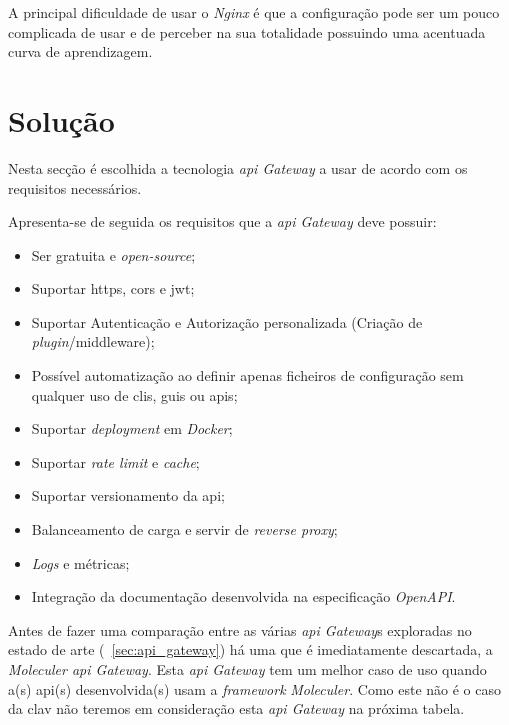 A principal dificuldade de usar o \textit{Nginx} é que a configuração pode ser um pouco complicada de usar e de perceber na sua totalidade possuindo uma acentuada curva de aprendizagem.

\section{Solução}

Nesta secção é escolhida a tecnologia \textit{\acrshort{api} Gateway} a usar de acordo com os requisitos necessários.

Apresenta-se de seguida os requisitos que a \textit{\acrshort{api} Gateway} deve possuir:
\begin{itemize}
    \item Ser gratuita e \textit{open-source};
    \item Suportar \acrshort{https}, \acrshort{cors} e \acrshort{jwt};
    \item Suportar Autenticação e Autorização personalizada (Criação de \textit{plugin}/middleware);
    \item Possível automatização ao definir apenas ficheiros de configuração sem qualquer uso de \acrshort{cli}s, 
    \acrshort{gui}s ou \acrshort{api}s;
    \item Suportar \textit{deployment} em \textit{Docker};
    \item Suportar \textit{rate limit} e \textit{cache};
    \item Suportar versionamento da \acrshort{api};
    \item Balanceamento de carga e servir de \textit{reverse proxy};
    \item \textit{Logs} e métricas;
    \item Integração da documentação desenvolvida na especificação \textit{OpenAPI}.
\end{itemize}

Antes de fazer uma comparação entre as várias \textit{\acrshort{api} Gateway}s exploradas no estado de arte 
(~\ref{sec:api_gateway}) há uma que é imediatamente descartada, a \textit{Moleculer \acrshort{api} Gateway}. 
Esta \textit{\acrshort{api} Gateway} tem um melhor caso de uso quando a(s) \acrshort{api}(s) desenvolvida(s) 
usam a \textit{framework} \textit{Moleculer}. Como este não é o caso da \acrshort{clav} não teremos em consideração 
esta \textit{\acrshort{api} Gateway} na próxima tabela.


